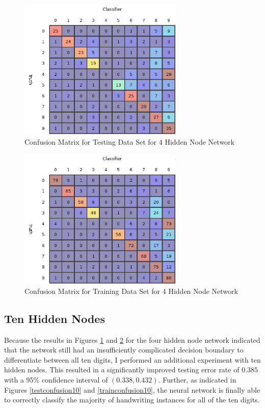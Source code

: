 \documentclass{article}
\begin{document}
\begin{figure}
\centering
\includegraphics[width=0.7\textwidth]{data/final/4_test_confusion.png}
\caption{Confusion Matrix for Testing Data Set for 4 Hidden Node Network}
\label{testconfusion4}
\end{figure}

\begin{figure}
\centering
\includegraphics[width=0.7\textwidth]{data/final/4_train_confusion.png}
\caption{Confusion Matrix for Training Data Set for 4 Hidden Node Network}
\label{trainconfusion4}
\end{figure}

\subsection{Ten Hidden Nodes}\label{hidden10}

Because the results in Figures \ref{testconfusion4} and \ref{trainconfusion4} for the four hidden node network indicated that the network still had an insufficiently complicated decision boundary to differentiate between all ten digits, I performed an additional experiment with ten hidden nodes. This resulted in a significantly improved testing error rate of \(0.385\) with a 95\% confidence interval of \((0.338 , 0.432)\). Further, as indicated in Figures \ref{testconfusion10} and \ref{trainconfusion10}, the neural network is finally able to correctly classify the majority of handwriting instances for all of the ten digits.
\end{document}
